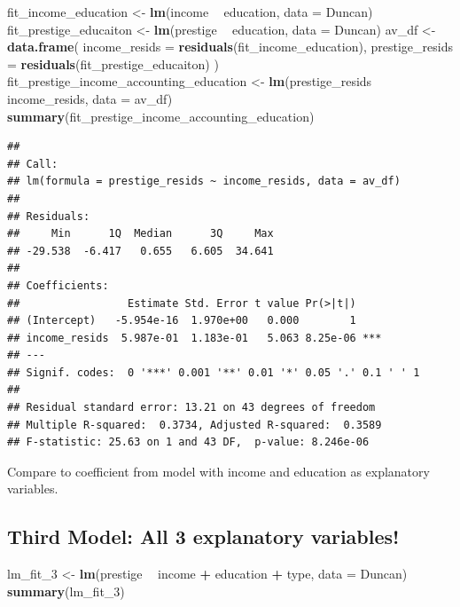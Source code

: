 \documentclass[]{extarticle}
\newenvironment{Shaded}{\begin{snugshade}}{\end{snugshade}}
\newcommand{\KeywordTok}[1]{\textcolor[rgb]{0.13,0.29,0.53}{\textbf{#1}}}
\newcommand{\DataTypeTok}[1]{\textcolor[rgb]{0.13,0.29,0.53}{#1}}
\newcommand{\DecValTok}[1]{\textcolor[rgb]{0.00,0.00,0.81}{#1}}
\newcommand{\StringTok}[1]{\textcolor[rgb]{0.31,0.60,0.02}{#1}}
\newcommand{\OperatorTok}[1]{\textcolor[rgb]{0.81,0.36,0.00}{\textbf{#1}}}
\newcommand{\NormalTok}[1]{#1}
\begin{document}
\begin{Shaded}
\begin{Highlighting}[]
\NormalTok{fit_income_education <-}\StringTok{ }\KeywordTok{lm}\NormalTok{(income }\OperatorTok{~}\StringTok{ }\NormalTok{education, }\DataTypeTok{data =}\NormalTok{ Duncan)}
\NormalTok{fit_prestige_educaiton <-}\StringTok{ }\KeywordTok{lm}\NormalTok{(prestige }\OperatorTok{~}\StringTok{ }\NormalTok{education, }\DataTypeTok{data =}\NormalTok{ Duncan)}
\NormalTok{av_df <-}\StringTok{ }\KeywordTok{data.frame}\NormalTok{(}
  \DataTypeTok{income_resids =} \KeywordTok{residuals}\NormalTok{(fit_income_education),}
  \DataTypeTok{prestige_resids =} \KeywordTok{residuals}\NormalTok{(fit_prestige_educaiton)}
\NormalTok{)}
\NormalTok{fit_prestige_income_accounting_education <-}\StringTok{ }\KeywordTok{lm}\NormalTok{(prestige_resids }\OperatorTok{~}\StringTok{ }\NormalTok{income_resids, }\DataTypeTok{data =}\NormalTok{ av_df)}
\KeywordTok{summary}\NormalTok{(fit_prestige_income_accounting_education)}
\end{Highlighting}
\end{Shaded}

\begin{verbatim}
## 
## Call:
## lm(formula = prestige_resids ~ income_resids, data = av_df)
## 
## Residuals:
##     Min      1Q  Median      3Q     Max 
## -29.538  -6.417   0.655   6.605  34.641 
## 
## Coefficients:
##                 Estimate Std. Error t value Pr(>|t|)    
## (Intercept)   -5.954e-16  1.970e+00   0.000        1    
## income_resids  5.987e-01  1.183e-01   5.063 8.25e-06 ***
## ---
## Signif. codes:  0 '***' 0.001 '**' 0.01 '*' 0.05 '.' 0.1 ' ' 1
## 
## Residual standard error: 13.21 on 43 degrees of freedom
## Multiple R-squared:  0.3734, Adjusted R-squared:  0.3589 
## F-statistic: 25.63 on 1 and 43 DF,  p-value: 8.246e-06
\end{verbatim}

Compare to coefficient from model with income and education as
explanatory variables.

\newpage

\subsection{Third Model: All 3 explanatory
variables!}\label{third-model-all-3-explanatory-variables}

\begin{Shaded}
\begin{Highlighting}[]
\NormalTok{lm_fit_}\DecValTok{3}\NormalTok{ <-}\StringTok{ }\KeywordTok{lm}\NormalTok{(prestige }\OperatorTok{~}\StringTok{ }\NormalTok{income }\OperatorTok{+}\StringTok{ }\NormalTok{education }\OperatorTok{+}\StringTok{ }\NormalTok{type, }\DataTypeTok{data =}\NormalTok{ Duncan)}
\KeywordTok{summary}\NormalTok{(lm_fit_}\DecValTok{3}\NormalTok{)}
\end{Highlighting}
\end{Shaded}
\end{document}
